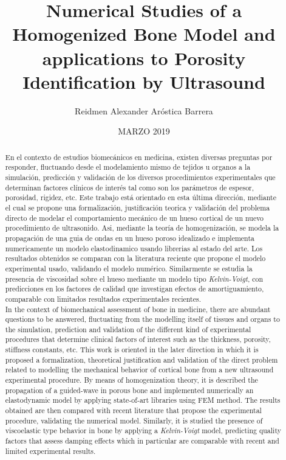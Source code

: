 \documentclass[upright, contnum]{umemoria}
\author{Reidmen Alexander Aróstica Barrera}
\title{Numerical Studies of a Homogenized Bone Model and applications to Porosity Identification by Ultrasound}
\date{MARZO 2019}
\begin{document}
\frontmatter
\maketitle

\begin{abstract}
En el contexto de estudios biomecánicos en medicina, existen diversas preguntas por responder, fluctuando desde el modelamiento mismo de tejidos u organos a la simulación, predicción y validación de los diversos procedimientos experimentales que determinan factores clínicos de interés tal como son los parámetros de espesor, porosidad, rigidez, etc. Este trabajo está orientado en esta última dirección, mediante el cual se propone una formalización, justificación teorica y validación del problema directo de modelar el comportamiento mecánico de un hueso cortical de un nuevo procedimiento de ultrasonido. Asi, mediante la teoría de homogenización, se modela la propagación de una guia de ondas en un hueso poroso idealizado e implementa numericamente un modelo elastodinamico usando librerias al estado del arte. Los resultados obtenidos se comparan con la literatura reciente que propone el modelo experimental usado, validando el modelo numérico. Similarmente se estudia la presencia de viscosidad sobre el hueso mediante un modelo tipo \textit{Kelvin-Voigt}, con predicciones en los factores de calidad que investigan efectos de amortiguamiento, comparable con limitados resultados experimentales recientes. \\

In the context of biomechanical assessment of bone in medicine, there are abundant questions to be answered, fluctuating from the modelling itself of tissues and organs to the simulation, prediction and validation of the different kind of experimental procedures that determine clinical factors of interest such as the thickness, porosity, stiffness constants, etc. This work is oriented in the later direction in which it is proposed a formalization, theoretical justification and validation of the direct problem related to modelling the mechanical behavior of cortical bone from a new ultrasound experimental procedure. By means of homogenization theory, it is described the propagation of a guided-wave in porous bone and implemented numerically an elastodynamic model by applying state-of-art libraries using FEM method. The results obtained are then compared with recent literature that propose the experimental procedure, validating the numerical model. Similarly, it is studied the presence of viscoelastic type behavior in bone by applying a \textit{Kelvin-Voigt} model, predicting quality factors that assess damping effects which in particular are comparable with recent and limited experimental results.
\end{abstract}
\end{document}
